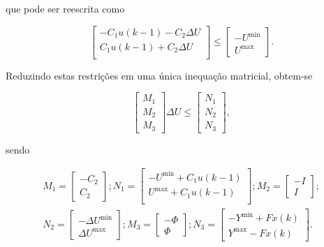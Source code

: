 que pode ser reescrita como

\begin{equation}
	\label{eq:generic-restriction-u-matrix-form}
	\begin{bmatrix}
		-C_1u(k-1) - C_2\Delta{}U \\
		C_1u(k-1) + C_2\Delta{}U  \\
	\end{bmatrix} \le
	\begin{bmatrix}
		-U^{\min} \\
		U^{\max}
	\end{bmatrix}.
\end{equation}

Reduzindo estas restrições em uma única inequação matricial, obtem-se

\begin{equation}
	\label{eq:generic-restriction-matrix}
	\begin{bmatrix}
		M_1 \\
		M_2 \\
		M_3
	\end{bmatrix} \Delta{}U \le
	\begin{bmatrix}
		N_1 \\
		N_2 \\
		N_3
	\end{bmatrix},
\end{equation}

sendo

\begin{equation*}
	\begin{split}
		M_1 =
		\begin{bmatrix}
			-C_2 \\
			C_2
		\end{bmatrix};
		N_1 =
		\begin{bmatrix}
			-U^{\min} + C_1u(k-1) \\
			U^{\max} + C_1u(k-1)  \\
		\end{bmatrix};
		M_2 =
		\begin{bmatrix}
			-I \\
			I
		\end{bmatrix}; \\
		N_2 =
		\begin{bmatrix}
			-\Delta{}U^{\min} \\
			\Delta{}U^{\max}
		\end{bmatrix};
		M_3 =
		\begin{bmatrix}
			-\Phi \\
			\Phi
		\end{bmatrix};
		N_3 =
		\begin{bmatrix}
			-Y^{\min} + Fx(k) \\
			Y^{\max} - Fx(k)
		\end{bmatrix}.
	\end{split}
\end{equation*}

